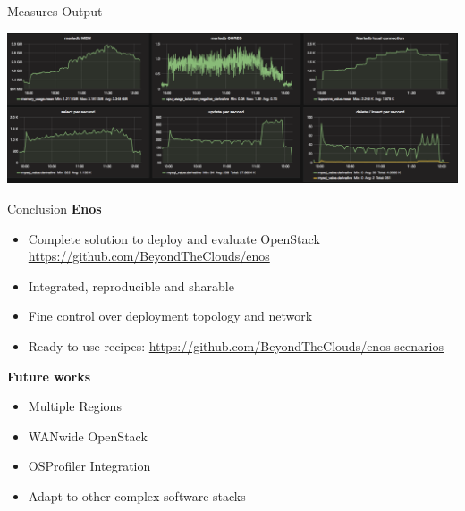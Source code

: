 \documentclass[10pt]{beamer}
\begin{document}
\begin{frame}{Measures Output}
  \begin{center}
  \includegraphics[width=\textwidth]{figs/grafana}
  \end{center}
\end{frame}

%

\begin{frame}{Conclusion}
  \textbf{Enos}
  \begin{itemize}
	 \item Complete solution to deploy and evaluate OpenStack
		\url{https://github.com/BeyondTheClouds/enos}
	 \item Integrated, reproducible and sharable
	 \item Fine control over deployment topology and network
	 \item Ready-to-use recipes:
		\url{https://github.com/BeyondTheClouds/enos-scenarios}
  \end{itemize}

  \vspace{.4cm}
  \textbf{Future works}
  \begin{itemize}
  \item Multiple Regions
  \item WANwide OpenStack
  \item OSProfiler Integration
  \item Adapt to other complex software stacks
  \end{itemize}
\end{frame}
\end{document}
